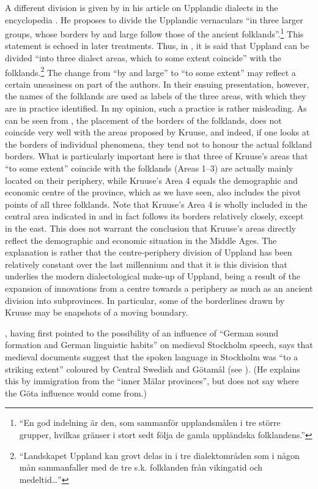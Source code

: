 A different division is given by \citet[1194]{Hesselman1920} in his article on Upplandic dialects in the encyclopedia . He proposes to divide the Upplandic vernaculars “in three larger groups, whose borders by and large follow those of the ancient folklands”.\footnote{ “En god indelning är den, som sammanför upplandsmålen i tre större grupper, hvilkas gränser i stort sedt följa de gamla uppländska folklandens.” } This statement is echoed in later treatments. Thus, in \citet[75]{KällskogEtAl1993}, it is said that Uppland can be divided “into three dialect areas, which to some extent coincide” with the folklands.\footnote{ “Landskapet Uppland kan grovt delas in i tre dialektområden som i någon mån sammanfaller med de tre s.k. folklanden från vikingatid och medeltid…” } The change from “by and large” to “to some extent” may reflect a certain uneasiness on part of the authors. In their ensuing presentation, however, the names of the folklands are used as labels of the three areas, with which they are in practice identified. In my opinion, such a practice is rather misleading. As can be seen from , the placement of the borders of the folklands, does not coincide very well with the areas proposed by Kruuse, and indeed, if one looks at the borders of individual phenomena, they tend not to honour the actual folkland borders. What is particularly important here is that three of Kruuse’s areas that “to some extent” coincide with the folklands (Areas 1--3) are actually mainly located on their periphery, while Kruuse’s Area 4 equals the demographic and economic centre of the province, which as we have seen, also includes the pivot points of all three folklands. Note that Kruuse’s Area 4 is wholly included in the central area indicated in  and in fact follows its borders relatively closely, except in the east. This does not warrant the conclusion that Kruuse’s areas directly reflect the demographic and economic situation in the Middle Ages. The explanation is rather that the centre-periphery division of Uppland has been relatively constant over the last millennium and that it is this division that underlies the modern dialectological make-up of Uppland, being a result of the expansion of innovations from a centre towards a periphery as much as an ancient division into subprovinces. In particular, some of the borderlines drawn by Kruuse may be snapshots of a moving boundary.

\citet[77]{Wessén1966}, having first pointed to the possibility of an influence of “German sound formation and German linguistic habits” on medieval Stockholm speech, says that medieval documents suggest that the spoken language in Stockholm was “to a striking extent” coloured by Central Swedish and Götamål (see ). (He explains this by immigration from the “inner Mälar provinces”, but does not say where the Göta influence would come from.)


